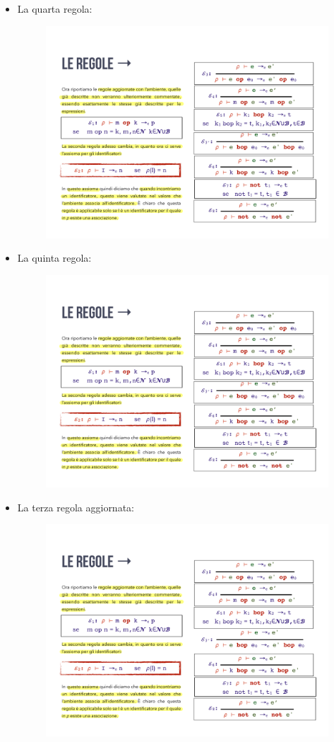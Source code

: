 \documentclass[a4paper]{article}
\begin{document}
\begin{itemize}
		\item La quarta regola:
		\begin{figure}[!htp]
			\centering
			\includegraphics[width=.6\textwidth]{img/regola_espressione-4.pdf}
		\end{figure}
		
		\item La quinta regola:
		\begin{figure}[!htp]
			\centering
			\includegraphics[width=.6\textwidth]{img/regola_espressione-5.pdf}
		\end{figure}
		
		\item La terza regola aggiornata:
		\begin{figure}[!htp]
			\centering
			\includegraphics[width=.6\textwidth]{img/regola_espressione-3b.pdf}
		\end{figure}\newpage
		

\end{itemize}
\end{document}
